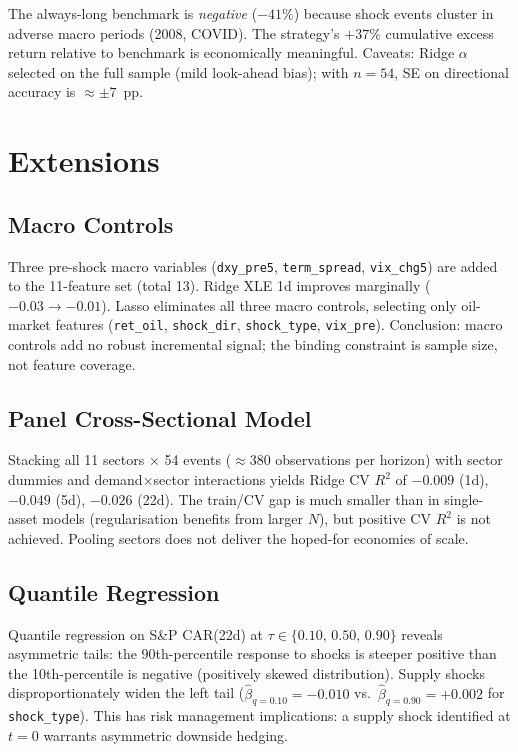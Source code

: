\documentclass[11pt,a4paper]{article}
\begin{document}
The always-long benchmark is \emph{negative} ($-41\%$) because shock events cluster in adverse macro periods (2008, COVID). The strategy's $+37\%$ cumulative excess return relative to benchmark is economically meaningful. Caveats: Ridge $\alpha$ selected on the full sample (mild look-ahead bias); with $n=54$, SE on directional accuracy is $\approx\pm7$~pp.

\section{Extensions}
\label{sec:extensions}

\subsection{Macro Controls}

Three pre-shock macro variables (\texttt{dxy\_pre5}, \texttt{term\_spread}, \texttt{vix\_chg5}) are added to the 11-feature set (total 13). Ridge XLE 1d improves marginally ($-0.03 \to -0.01$). Lasso eliminates all three macro controls, selecting only oil-market features (\texttt{ret\_oil}, \texttt{shock\_dir}, \texttt{shock\_type}, \texttt{vix\_pre}). Conclusion: macro controls add no robust incremental signal; the binding constraint is sample size, not feature coverage.

\subsection{Panel Cross-Sectional Model}

Stacking all 11 sectors $\times$ 54 events ($\approx$380 observations per horizon) with sector dummies and demand$\times$sector interactions yields Ridge CV $R^2$ of $-0.009$ (1d), $-0.049$ (5d), $-0.026$ (22d). The train/CV gap is much smaller than in single-asset models (regularisation benefits from larger $N$), but positive CV $R^2$ is not achieved. Pooling sectors does not deliver the hoped-for economies of scale.

\subsection{Quantile Regression}

Quantile regression on S\&P CAR(22d) at $\tau \in \{0.10,\, 0.50,\, 0.90\}$ reveals asymmetric tails: the 90th-percentile response to shocks is steeper positive than the 10th-percentile is negative (positively skewed distribution). Supply shocks disproportionately widen the left tail ($\hat{\beta}_{q=0.10} = -0.010$ vs.\ $\hat{\beta}_{q=0.90} = +0.002$ for \texttt{shock\_type}). This has risk management implications: a supply shock identified at $t=0$ warrants asymmetric downside hedging.
\end{document}
